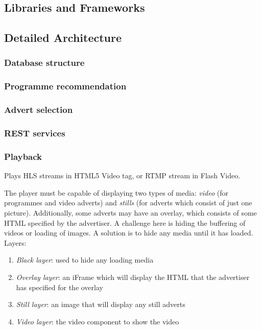 \subsection{Libraries and Frameworks}

\subsection{Detailed Architecture}

\subsubsection{Database structure}

\subsubsection{Programme recommendation}

\subsubsection{Advert selection}

\subsubsection{REST services}

\subsubsection{Playback}
Plays HLS streams in HTML5 Video tag, or RTMP stream in Flash Video.

The player must be capable of displaying two types of media: \textit{video} (for programmes and video adverts) and \textit{stills} (for adverts which consist of just one picture). Additionally, some adverts may have an overlay, which consists of some HTML specified by the advertiser. A challenge here is hiding the buffering of videos or loading of images. A solution is to hide any media until it has loaded. Layers:
\begin{enumerate}
\item \textit{Black layer}: used to hide any loading media
\item \textit{Overlay layer}: an iFrame which will display the HTML that the advertiser has specified for the overlay
\item \textit{Still layer}: an image that will display any still adverts
\item \textit{Video layer}: the video component to show the video
\end{enumerate}

